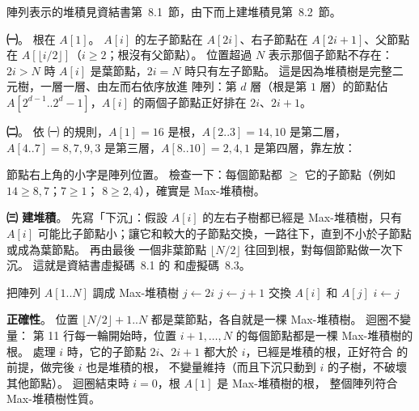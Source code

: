 \begin{pastsoln}
陣列表示的堆積見資結書第~8.1~節，由下而上建堆積見第~8.2~節。

\textbf{㈠}。 根在 $A[1]$。 $A[i]$ 的左子節點在 $A[2i]$、右子節點在 $A[2i+1]$、父節點在
$A[\lfloor i/2 \rfloor]$（$i \ge 2$；根沒有父節點）。 位置超過 $N$ 表示那個子節點不存在：$2i > N$ 時
$A[i]$ 是葉節點，$2i = N$ 時只有左子節點。 這是因為堆積樹是完整二元樹，一層一層、由左而右依序放進
陣列：第 $d$ 層（根是第 $1$ 層）的節點佔 $A[2^{d-1}..2^{d}-1]$，$A[i]$ 的兩個子節點正好排在
$2i$、$2i + 1$。

\textbf{㈡}。 依 ㈠ 的規則，$A[1] = 16$ 是根，$A[2..3] = 14, 10$ 是第二層，$A[4..7] = 8, 7, 9, 3$
是第三層，$A[8..10] = 2, 4, 1$ 是第四層，靠左放：
\begin{center}
\end{center}
節點右上角的小字是陣列位置。 檢查一下：每個節點都 $\ge$ 它的子節點（例如 $14 \ge 8, 7$；$7 \ge 1$；
$8 \ge 2, 4$），確實是 Max-堆積樹。

\textbf{㈢ 建堆積}。 先寫「下沉」：假設 $A[i]$ 的左右子樹都已經是 Max-堆積樹，只有
$A[i]$ 可能比子節點小；讓它和較大的子節點交換，一路往下，直到不小於子節點或成為葉節點。 再由最後
一個非葉節點 $\lfloor N/2 \rfloor$ 往回到根，對每個節點做一次下沉。 這就是資結書虛擬碼~8.1 的
 和虛擬碼~8.3。
\begin{pseudo}[unbreakable]{把陣列 $A[1..N]$ 調成 Max-堆積樹}
        \State $j \gets 2i$ 
            \State $j \gets j + 1$ 
        \EndIf
            \State \Return
        \EndIf
        \State 交換 $A[i]$ 和 $A[j]$
        \State $i \gets j$
    \EndWhile
\EndProcedure
\Statex
{}
        \State {}
    \EndFor
\EndProcedure
\end{pseudo}
\textbf{正確性}。 位置 $\lfloor N/2 \rfloor + 1..N$ 都是葉節點，各自就是一棵 Max-堆積樹。 迴圈不變量：
第 11 行每一輪開始時，位置 $i + 1, \ldots, N$ 的每個節點都是一棵 Max-堆積樹的根。 處理 $i$ 時，它的子節點
$2i$、$2i + 1$ 都大於 $i$，已經是堆積的根，正好符合  的前提，做完後 $i$ 也是堆積的根，
不變量維持（而且下沉只動到 $i$ 的子樹，不破壞其他節點）。 迴圈結束時 $i = 0$，根 $A[1]$ 是 Max-堆積樹的根，
整個陣列符合 Max-堆積樹性質。


\end{pastsoln}
